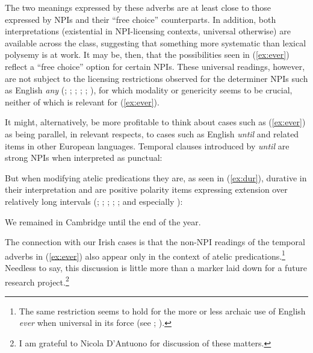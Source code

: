 \documentclass[output=paper,colorlinks,citecolor=brown]{langscibook}
\begin{document}
The two meanings expressed by these adverbs are at least close to those expressed by NPIs and their “free choice” counterparts. In addition, both interpretations (existential in NPI-licensing contexts, universal otherwise) are available across the class, suggesting that something more systematic than lexical polysemy is at work. It may be, then, that the possibilities seen in (\ref{ex:ever}) reflect a “free choice” option for certain NPIs. These universal readings, however, are not subject to the licensing restrictions observed for the determiner NPIs such as English {\itshape any} (\cite{legrand:75}; \cite{kadmon-landman:93}; \cite{dayal:98}; \cite{dayal:13}; \cite{giannakidou:01}; \cite[Chap. 6]{chierchia:13}), for which modality or genericity seems to be crucial, neither of which is relevant for (\ref{ex:ever}). 

It might, alternatively, be more profitable to think about cases such as (\ref{ex:ever}) as being parallel, in relevant respects, to cases such as English \textit{until} and related items in other European languages. Temporal clauses introduced by \textit{until} are strong NPIs when interpreted as punctual:

\ea
{}
\z
\z


But when modifying atelic predications they are, as seen in (\ref{ex:dur}), durative in their interpretation and are positive polarity items expressing extension over relatively long intervals (\cite{karttunen:74}; \cite{mittwoch:77}; \cite{giannakidou:02a}; \cite{declerck:95}; \cite{deswart:96}; and especially \cite{condoravdi:08}): 

\ea\label{ex:dur}
We remained in Cambridge until the end of the year.
\z

The connection with our Irish cases is that the non-NPI readings of the temporal adverbs in (\ref{ex:ever}) also appear only in the context of atelic predications.\footnote{The same restriction seems to hold for the more or less archaic use of English {\itshape {\itshape ever}} when universal in its force (see \cite{israel:98}; \cite[181--183]{horn:00}).} Needless to say, this discussion is little more than a marker laid down for a future research project.\footnote{I am grateful to Nicola D'Antuono for discussion of these matters.}
\end{document}
